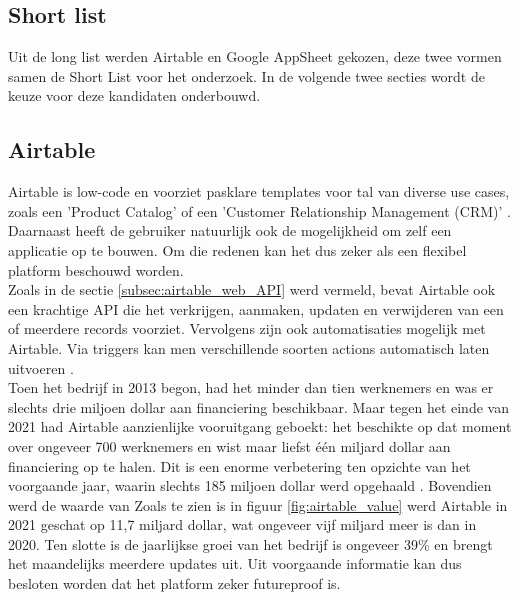 \subsection{Short list}

Uit de long list werden Airtable en Google AppSheet gekozen, deze twee vormen samen de Short List voor het onderzoek. In de volgende twee secties wordt de keuze voor deze kandidaten onderbouwd. 

\subsection{Airtable} 

Airtable is low-code en voorziet pasklare templates voor tal van diverse use cases, zoals een 'Product Catalog' of een 'Customer Relationship Management (CRM)' \autocite{Maout2022}. Daarnaast heeft de gebruiker natuurlijk ook de mogelijkheid om zelf een applicatie op te bouwen. Om die redenen kan het dus zeker als een flexibel platform beschouwd worden. \\

Zoals in de sectie \ref{subsec:airtable_web_API} werd vermeld, bevat Airtable ook een krachtige API die het verkrijgen, aanmaken, updaten en verwijderen van een of meerdere records voorziet. Vervolgens zijn ook automatisaties mogelijk met Airtable. Via triggers kan men verschillende soorten actions automatisch laten uitvoeren \autocite{AirtableAutomations2023}. \\

Toen het bedrijf in 2013 begon, had het minder dan tien werknemers en was er slechts drie miljoen dollar aan financiering beschikbaar. Maar tegen het einde van 2021 had Airtable aanzienlijke vooruitgang geboekt: het beschikte op dat moment over ongeveer 700 werknemers en wist maar liefst één miljard dollar aan financiering op te halen. Dit is een enorme verbetering ten opzichte van het voorgaande jaar, waarin slechts 185 miljoen dollar werd opgehaald \autocite{Khemchandani2023}. Bovendien werd de waarde van Zoals te zien is in figuur \ref{fig:airtable_value} werd Airtable in 2021 geschat op 11,7 miljard dollar, wat ongeveer vijf miljard meer is dan in 2020. Ten slotte is de jaarlijkse groei van het bedrijf is ongeveer 39\% en brengt het maandelijks meerdere updates uit. Uit voorgaande informatie kan dus besloten worden dat het platform zeker futureproof is. \\

